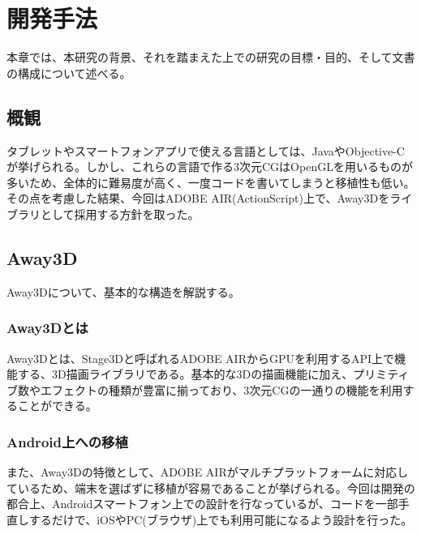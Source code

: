 \chapter{開発手法}
\label{chap:coding}

本章では、本研究の背景、それを踏まえた上での研究の目標・目的、そして文書の構成について述べる。

\section{概観}
タブレットやスマートフォンアプリで使える言語としては、JavaやObjective-Cが挙げられる。しかし、これらの言語で作る3次元CGはOpenGLを用いるものが多いため、全体的に難易度が高く、一度コードを書いてしまうと移植性も低い。その点を考慮した結果、今回はADOBE AIR(ActionScript)上で、Away3Dをライブラリとして採用する方針を取った。

\section{Away3D}
Away3Dについて、基本的な構造を解説する。

\subsection{Away3Dとは}
Away3Dとは、Stage3Dと呼ばれるADOBE AIRからGPUを利用するAPI上で機能する、3D描画ライブラリである。基本的な3Dの描画機能に加え、プリミティブ数やエフェクトの種類が豊富に揃っており、3次元CGの一通りの機能を利用することができる。

\subsection{Android上への移植}
また、Away3Dの特徴として、ADOBE AIRがマルチプラットフォームに対応しているため、端末を選ばずに移植が容易であることが挙げられる。今回は開発の都合上、Androidスマートフォン上での設計を行なっているが、コードを一部手直しするだけで、iOSやPC(ブラウザ)上でも利用可能になるよう設計を行った。